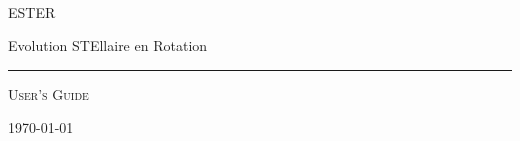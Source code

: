 \begin{titlepage}

\ 

\vspace{2cm}


{\fontsize{78}{78}\selectfont \textsf{ESTER}}

\vspace{0.2cm}

\hspace{2pt}  {\LARGE \textsf{E}volution \textsf{STE}llaire en \textsf{R}otation}

{\color{darkred} \rule{\textwidth}{2pt}}

\vspace{2cm}

\begin{center}
{\fontsize{42}{42}\selectfont \textsc{User's Guide}}
\end{center}

\vfill

\hfill{\Large\today}

\end{titlepage}

